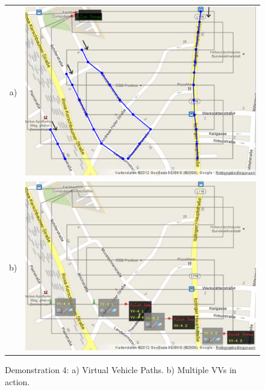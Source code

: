 \begin{figure}[h]
	\begin{center}
		\begin{tabular}{rr}
		a)&{\includegraphics[width=11.42cm]{ese-demo4-1.png}} \\
		b)&{\includegraphics[width=11.42cm]{ese-demo4-2.png}}
		\end{tabular}
	\end{center}
		\caption{Demonstration 4: a) Virtual Vehicle Paths. 
		b) Multiple \acsp{VV} in action.\label{fig:demo4img1}}
\end{figure}

